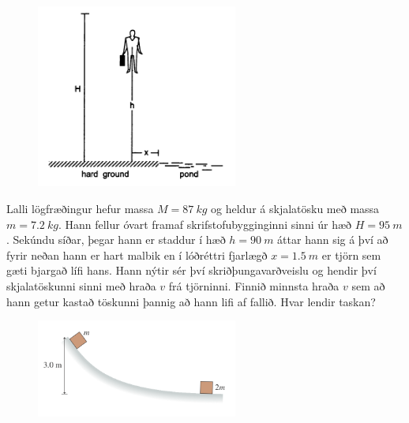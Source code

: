 \ifdefined \wholebook \else\documentclass[oneside]{book}\usepackage{EdlBook}\graphicspath{{figures/}}
\begin{document}
\begin{enumerate}[label = \textbf{Dæmi \thechapter.\arabic*.}]
\vspace{0.3cm}

\begin{minipage}{\linewidth}
\begin{figure}
\centering
\vspace{-0.5cm}
\includegraphics[width=2.6in]{images/pond.png}
   \label{fig:amypond}
\end{figure}

\item Lalli lögfræðingur hefur massa $M = \SI{87}{kg}$ og heldur á skjalatösku með massa $m = \SI{7.2}{kg}$. Hann fellur óvart framaf skrifstofubygginginni sinni úr hæð $H = \SI{95}{m}$. Sekúndu síðar, þegar hann er staddur í hæð $h = \SI{90}{m}$ áttar hann sig á því að fyrir neðan hann er hart malbik en í lóðréttri fjarlægð $x = \SI{1.5}{m}$ er tjörn sem gæti bjargað lífi hans. Hann nýtir sér því skriðþungavarðveislu og hendir því skjalatöskunni sinni með hraða $v$ 
frá tjörninni. Finnið minnsta hraða $v$ sem að hann getur kastað töskunni þannig að hann lifi af fallið. Hvar lendir taskan?

\end{minipage}

\newpage



\begin{minipage}{\linewidth}
\begin{figure}
\centering
\vspace{-1cm}
\includegraphics[width=2.6in]{images/skab.png}
   \label{fig:vifilfell}
\end{figure}


\end{minipage}
\end{enumerate}
\end{document}
